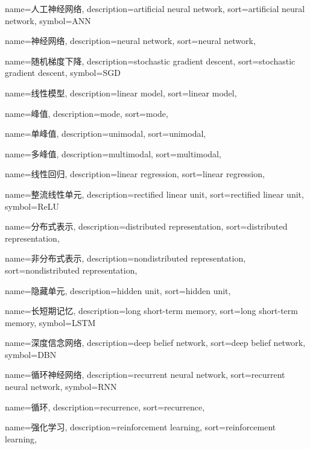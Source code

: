 {
  name=人工神经网络,
  description={artificial neural network},
  sort={artificial neural network},
  symbol={ANN}
}

{
  name=神经网络,
  description={neural network},
  sort={neural network},
}

{
  name=随机梯度下降,
  description={stochastic gradient descent},
  sort={stochastic gradient descent},
  symbol={SGD}
}

{
  name=线性模型,
  description={linear model},
  sort={linear model},
}

{
  name=峰值,
  description={mode},
  sort={mode},
}

{
  name=单峰值,
  description={unimodal},
  sort={unimodal},
}

{
	name=多峰值,
	description={multimodal},
	sort={multimodal},
}

{
  name=线性回归,
  description={linear regression},
  sort={linear regression},
}

{
  name=整流线性单元,
  description={rectified linear unit},
  sort={rectified linear unit},
  symbol={ReLU}
}

{
  name=分布式表示,
  description={distributed representation},
  sort={distributed representation},
}

{
  name=非分布式表示,
  description={nondistributed representation},
  sort={nondistributed representation},
}

{
  name=隐藏单元,
  description={hidden unit},
  sort={hidden unit},
}

{
  name=长短期记忆,
  description={long short-term memory},
  sort={long short-term memory},
  symbol={LSTM}
}

{
  name=深度信念网络,
  description={deep belief network},
  sort={deep belief network},
  symbol={DBN}
}

{
  name=循环神经网络,
  description={recurrent neural network},
  sort={recurrent neural network},
  symbol={RNN}
}

{
  name=循环,
  description={recurrence},
  sort={recurrence},
}

{
  name=强化学习,
  description={reinforcement learning},
  sort={reinforcement learning},
}

